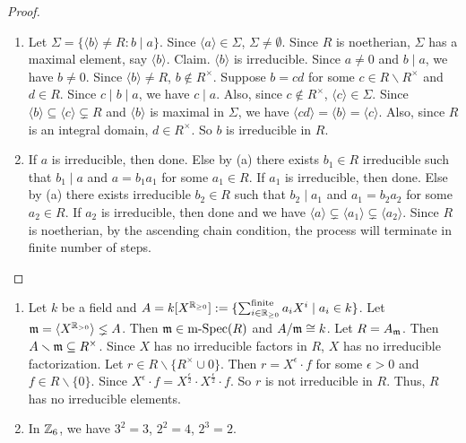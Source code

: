 \begin{proof}
    \begin{enumerate}
        \item Let $\Sigma = \{\langle b \rangle \neq R : b \mid a\}$. Since $\langle a \rangle \in \Sigma$, $\Sigma \neq \emptyset$. Since $R$ is noetherian, $\Sigma$ has a maximal element, say $\langle b \rangle$. Claim. $\langle b \rangle$ is irreducible. Since $a \neq 0$ and $b \mid a$, we have $b \neq 0$. Since $\langle b \rangle \neq R$, $b \not \in R^{\times}$. Suppose $b = cd$ for some $c \in R \smallsetminus R^{\times}$ and $d \in R$. Since $c \mid b \mid a$, we have $c \mid a$. Also, since $c \not \in R^{\times}$, $\langle c \rangle \in \Sigma$. Since $\langle b \rangle \subseteq \langle c \rangle \subsetneq R$ and $\langle b \rangle$ is maximal in $\Sigma$, we have $\langle cd \rangle = \langle b \rangle = \langle c \rangle$. Also, since $R$ is an integral domain, $d \in R^{\times}$. So $b$ is irreducible in $R$.
        \item If $a$ is irreducible, then done. Else by (a) there exists $b_1 \in R$ irreducible such that $b_1 \mid a$ and $a = b_1a_1$ for some $a_1 \in R$. If $a_1$ is irreducible, then done. Else by (a) there exists irreducible $b_2 \in R$ such that $b_2 \mid a_1$ and $a_1 = b_2a_2$ for some $a_2 \in R$. If $a_2$ is irreducible, then done and we have $\langle a \rangle \subsetneq \langle a_1 \rangle \subsetneq \langle a_2 \rangle$. Since $R$ is noetherian, by the ascending chain condition, the process will terminate in finite number of steps. \qedhere
    \end{enumerate}
\end{proof}

\begin{example}\label{4.3}
    \begin{enumerate}
        \item 
            Let $k$ be a field and $A = k[X^{\mathbb{R}_{\geq 0}}] := \{\sum_{i \in \mathbb{R}_{\geq 0}}^{\text{finite}}a_iX^{i} \mid a_i \in k\}$. Let $\mathfrak{m} = \langle X^{\mathbb{R}_{>0}} \rangle \lneq A$. Then $\mathfrak{m} \in \operatorname{m-Spec}(R)$ and $A/\mathfrak{m} \cong k$. Let $R = A_{\mathfrak{m}}$. Then $A \smallsetminus \mathfrak{m} \subseteq R^{\times}$. Since $X$ has no irreducible factors in $R$, $X$ has no irreducible factorization. Let $r \in R \smallsetminus \{R^{\times} \cup 0\}$. Then $r = X^{\epsilon} \cdot f$ for some $\epsilon > 0$ and $f \in R \smallsetminus \{0\}$. Since $X^{\epsilon} \cdot f = X^{\frac{\epsilon}{2}} \cdot X^{\frac{\epsilon}{2}} \cdot f$. So $r$ is not irreducible in $R$. Thus, $R$ has no irreducible elements.
        \item 
            In $\mathbb{Z}_6$, we have $3^{2} = 3$, $2^{2} = 4$, $2^{3} = 2$.
    \end{enumerate}
\end{example}

